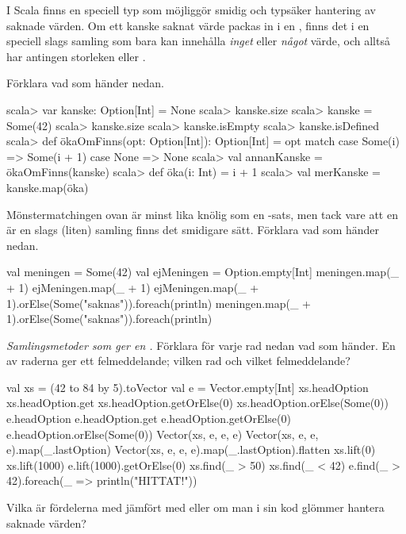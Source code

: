 I Scala finns en speciell typ  som möjliggör smidig och typsäker hantering av saknade värden. Om ett kanske saknat värde packas in i en  , finns det i en speciell slags samling som bara kan innehålla \emph{inget} eller \emph{något} värde, och alltså har antingen storleken  eller .

\Subtask Förklara vad som händer nedan.
\begin{REPL}
scala> var kanske: Option[Int] = None
scala> kanske.size
scala> kanske = Some(42)
scala> kanske.size
scala> kanske.isEmpty
scala> kanske.isDefined
scala> def ökaOmFinns(opt: Option[Int]): Option[Int] = opt match
         case Some(i) => Some(i + 1)
         case None    => None
scala> val annanKanske = ökaOmFinns(kanske)
scala> def öka(i: Int) = i + 1
scala> val merKanske = kanske.map(öka)
\end{REPL}

\Subtask Mönstermatchingen ovan är minst lika knölig som en -sats, men tack vare att en  är en slags (liten) samling finns det smidigare sätt. Förklara vad som händer nedan.
\begin{REPL}
val meningen = Some(42)
val ejMeningen = Option.empty[Int]
meningen.map(_ + 1)
ejMeningen.map(_ + 1)
ejMeningen.map(_ + 1).orElse(Some("saknas")).foreach(println)
meningen.map(_ + 1).orElse(Some("saknas")).foreach(println)
\end{REPL}

\Subtask \emph{Samlingsmetoder som ger en .} Förklara för varje rad nedan vad som händer. En av raderna ger ett felmeddelande; vilken rad och vilket felmeddelande?
\begin{REPL}
val xs = (42 to 84 by 5).toVector
val e = Vector.empty[Int]
xs.headOption
xs.headOption.get
xs.headOption.getOrElse(0)
xs.headOption.orElse(Some(0))
e.headOption
e.headOption.get
e.headOption.getOrElse(0)
e.headOption.orElse(Some(0))
Vector(xs, e, e, e)
Vector(xs, e, e, e).map(_.lastOption)
Vector(xs, e, e, e).map(_.lastOption).flatten
xs.lift(0)
xs.lift(1000)
e.lift(1000).getOrElse(0)
xs.find(_ > 50)
xs.find(_ < 42)
e.find(_ > 42).foreach(_ => println("HITTAT!"))
\end{REPL}

\Subtask Vilka är fördelerna med  jämfört med  eller  om man i sin kod glömmer hantera saknade värden?

\SOLUTION


\TaskSolved \what


